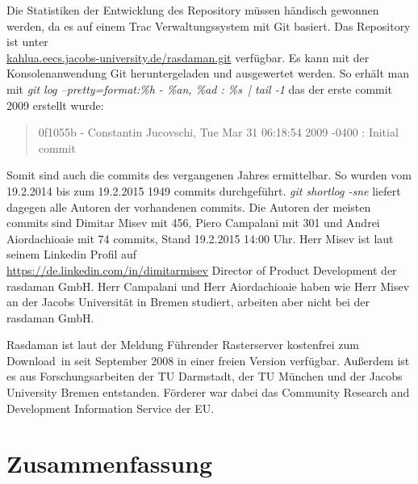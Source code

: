 Die Statistiken der Entwicklung des Repository müssen händisch gewonnen werden, da es auf einem Trac Verwaltungssystem mit Git basiert.
Das Repository ist unter\\\url{kahlua.eecs.jacobs-university.de/rasdaman.git} verfügbar.
Es kann mit der Konsolenanwendung Git heruntergeladen und ausgewertet werden.
So erhält man mit \textit{git log --pretty=format:\grqq \%h - \%an, \%ad : \%s\grqq\ | tail -1} das der erste commit 2009 erstellt wurde:
\begin{quote}
0f1055b - Constantin Jucovschi, Tue Mar 31 06:18:54 2009 -0400 : Initial commit
\end{quote}
Somit sind auch die commits des vergangenen Jahres ermittelbar.
So wurden vom 19.2.2014 bis zum 19.2.2015 1949 commits durchgeführt.
\textit{git shortlog -sne} liefert dagegen alle Autoren der vorhandenen commits.
Die Autoren der meisten commits sind Dimitar Misev mit 456, Piero Campalani mit 301 und Andrei Aiordachioaie mit 74 commits, Stand 19.2.2015 14:00 Uhr.
Herr Misev ist laut seinem Linkedin Profil auf\\\url{https://de.linkedin.com/in/dimitarmisev} Director of Product Development der \mbox{rasdaman} GmbH.
Herr Campalani und Herr Aiordachioaie haben wie Herr Misev an der Jacobs Universität in Bremen studiert, arbeiten aber nicht bei der \mbox{rasdaman} GmbH.

Rasdaman ist laut der Meldung \glqq Führender Rasterserver kostenfrei zum Download\grqq\ in \cite{website:rasdaman-newsarchive} seit September 2008 in einer freien Version verfügbar.
Außerdem ist es aus Forschungsarbeiten der TU Darmstadt, der TU München und der Jacobs University Bremen entstanden.
Förderer war dabei das Community Research and Development Information Service der EU. \cite{website:rasdaman-cordis}

\section{Zusammenfassung}
